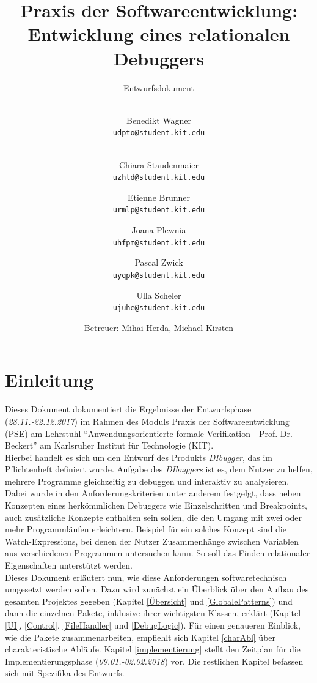 \documentclass[parskip=full]{scrartcl}
\title{
	\vspace{2cm}
	\myfont 
	Praxis der Softwareentwicklung:\\ 
	Entwicklung eines relationalen Debuggers\\
}
\subtitle{
	\vspace{1cm}
	\myfont
	Entwurfsdokument
}
\author{
	\vspace{1cm} \\
	Benedikt Wagner\\
	\texttt{udpto@student.kit.edu}
	\and \vspace{1cm} \\ Chiara Staudenmaier\\
	\texttt{uzhtd@student.kit.edu}
	\and Etienne Brunner\\
	\texttt{urmlp@student.kit.edu}
	\and Joana Plewnia\\
	\texttt{uhfpm@student.kit.edu} 
	\and Pascal Zwick\\
	\texttt{uyqpk@student.kit.edu}
	\and Ulla Scheler\\
	\texttt{ujuhe@student.kit.edu}
	\vspace{1cm}
	\and Betreuer: Mihai Herda, Michael Kirsten
	\vspace{4cm}
}
\begin{document}
\clearpage
\maketitle
{}
\newpage

\tableofcontents
\newpage
{}
\section{Einleitung}
Dieses Dokument dokumentiert die Ergebnisse der Entwurfsphase (\textit{28.11.-22.12.2017}) im Rahmen des Moduls Praxis der Softwareentwicklung (PSE) am Lehrstuhl \enquote{Anwendungsorientierte formale Verifikation - Prof. Dr. Beckert} am Karlsruher Institut für Technologie (KIT).\\
Hierbei handelt es sich um den Entwurf des Produkts \textit{DIbugger}, das im Pflichtenheft definiert wurde. Aufgabe des \textit{DIbuggers} ist es, dem Nutzer zu helfen, mehrere Programme gleichzeitig zu debuggen und interaktiv zu analysieren. \\
Dabei wurde in den Anforderungskriterien unter anderem festgelgt, dass neben Konzepten eines herkömmlichen Debuggers wie Einzelschritten und Breakpoints, auch zusätzliche  Konzepte enthalten sein sollen, die den Umgang mit zwei oder mehr Programmläufen erleichtern. Beispiel für ein solches Konzept sind die Watch-Expressions, bei denen der Nutzer Zusammenhänge zwischen Variablen aus verschiedenen Programmen untersuchen kann. So soll das Finden relationaler Eigenschaften unterstützt werden. \\
Dieses Dokument erläutert nun, wie diese Anforderungen softwaretechnisch umgesetzt werden sollen. Dazu wird zunächst ein Überblick über den Aufbau des gesamten Projektes gegeben (Kapitel \ref{Übersicht} und \ref{GlobalePatterns}) und dann die einzelnen Pakete, inklusive ihrer wichtigsten Klassen, erklärt (Kapitel \ref{UI}, \ref{Control}, \ref{FileHandler} und \ref{DebugLogic}). Für einen genaueren Einblick, wie die Pakete zusammenarbeiten, empfiehlt sich Kapitel \ref{charAbl} über charakteristische Abläufe. Kapitel \ref{implementierung} stellt den Zeitplan für die Implementierungsphase (\textit{09.01.-02.02.2018}) vor. Die restlichen Kapitel befassen sich mit Spezifika des Entwurfs.
\end{document}
